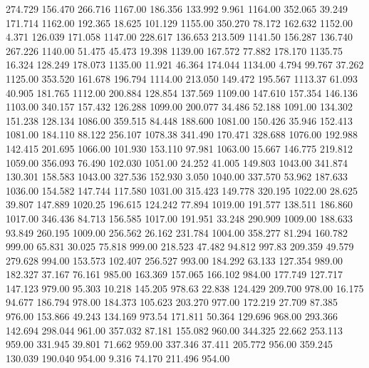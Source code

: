  274.729  156.470  266.716      1167.00
 186.356  133.992    9.961      1164.00
 352.065   39.249  171.714      1162.00
 192.365   18.625  101.129      1155.00
 350.270   78.172  162.632      1152.00
   4.371  126.039  171.058      1147.00
 228.617  136.653  213.509      1141.50
 156.287  136.740  267.226      1140.00
  51.475   45.473   19.398      1139.00
 167.572   77.882  178.170      1135.75
  16.324  128.249  178.073      1135.00
  11.921   46.364  174.044      1134.00
   4.794   99.767   37.262      1125.00
 353.520  161.678  196.794      1114.00
 213.050  149.472  195.567      1113.37
  61.093   40.905  181.765      1112.00
 200.884  128.854  137.569      1109.00
 147.610  157.354  146.136      1103.00
 340.157  157.432  126.288      1099.00
 200.077   34.486   52.188      1091.00
 134.302  151.238  128.134      1086.00
 359.515   84.448  188.600      1081.00
 150.426   35.946  152.413      1081.00
 184.110   88.122  256.107      1078.38
 341.490  170.471  328.688      1076.00
 192.988  142.415  201.695      1066.00
 101.930  153.110   97.981      1063.00
  15.667  146.775  219.812      1059.00
 356.093   76.490  102.030      1051.00
  24.252   41.005  149.803      1043.00
 341.874  130.301  158.583      1043.00
 327.536  152.930    3.050      1040.00
 337.570   53.962  187.633      1036.00
 154.582  147.744  117.580      1031.00
 315.423  149.778  320.195      1022.00
  28.625   39.807  147.889      1020.25
 196.615  124.242   77.894      1019.00
 191.577  138.511  186.860      1017.00
 346.436   84.713  156.585      1017.00
 191.951   33.248  290.909      1009.00
 188.633   93.849  260.195      1009.00
 256.562   26.162  231.784      1004.00
 358.277   81.294  160.782       999.00
  65.831   30.025   75.818       999.00
 218.523   47.482   94.812       997.83
 209.359   49.579  279.628       994.00
 153.573  102.407  256.527       993.00
 184.292   63.133  127.354       989.00
 182.327   37.167   76.161       985.00
 163.369  157.065  166.102       984.00
 177.749  127.717  147.123       979.00
  95.303   10.218  145.205       978.63
  22.838  124.429  209.700       978.00
  16.175   94.677  186.794       978.00
 184.373  105.623  203.270       977.00
 172.219   27.709   87.385       976.00
 153.866   49.243  134.169       973.54
 171.811   50.364  129.696       968.00
 293.366  142.694  298.044       961.00
 357.032   87.181  155.082       960.00
 344.325   22.662  253.113       959.00
 331.945   39.801   71.662       959.00
 337.346   37.411  205.772       956.00
 359.245  130.039  190.040       954.00
   9.316   74.170  211.496       954.00
